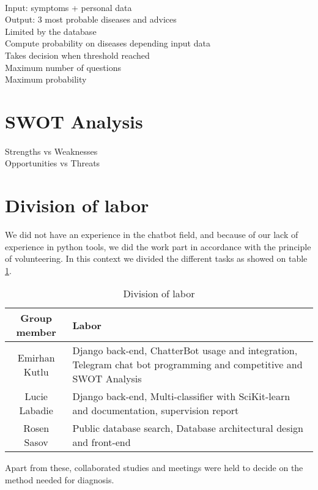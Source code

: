 \paragraph{}
Input: symptoms + personal data \\
Output: 3 most probable diseases and advices \\
Limited by the database \\
Compute probability on diseases depending input data \\
Takes decision when threshold reached \\
Maximum number of questions \\
Maximum probability 


\section{SWOT Analysis}

\paragraph{}
Strengths vs Weaknesses \\
Opportunities vs Threats

\section{Division of labor}

We did not have an experience in the chatbot field, and because of our lack of experience in python	tools, we did the work part in accordance with the principle of volunteering. In this context we divided the different tasks as showed on table \ref{labor}.
\begin{table}[H]
	\centering
	\begin{tabular}{|c|p{10cm}|}
		\hline
		\textbf{Group member} & \textbf{Labor} \\
		\hline
		Emirhan	Kutlu & Django back-end, ChatterBot usage and integration, Telegram chat bot programming and competitive and SWOT Analysis \\
		\hline
		Lucie Labadie & Django back-end, Multi-classifier with SciKit-learn and documentation, supervision report \\
		\hline
		Rosen Sasov & Public database search, Database architectural design and front-end \\
		\hline
	\end{tabular}
	\caption{Division of labor}
	\label{labor}
\end{table}	

Apart from these, collaborated studies and meetings	were held to decide on the method needed for diagnosis.